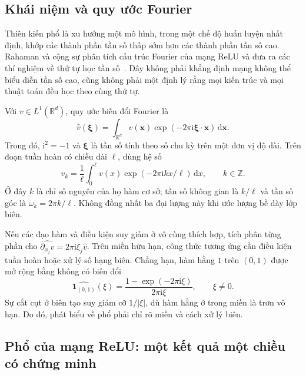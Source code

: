 \subsection{Khái niệm và quy ước Fourier}

Thiên kiến phổ là xu hướng một mô hình, trong một chế độ huấn luyện
nhất định, khớp các thành phần tần số thấp sớm hơn các thành phần tần
số cao. Rahaman và cộng sự phân tích cấu trúc Fourier của mạng ReLU
và đưa ra các thí nghiệm về thứ tự học tần số~\cite{rahaman2019}.
Đây không phải khẳng định mạng không thể biểu diễn tần số cao, cũng
không phải một định lý rằng mọi kiến trúc và mọi thuật toán đều học
theo cùng thứ tự.

Với $v\in L^1(\mathbb{R}^{d})$, quy ước biến đổi Fourier là
\begin{equation}
 \widehat v(\boldsymbol{\xi})
 =\int_{\mathbb{R}^{d}}v(\mathbf{x})
                  \exp(-2\pi\mathrm{i}\boldsymbol{\xi}\cdot\mathbf{x})
                  \,\mathrm{d}\mathbf{x}.
 \label{p4:eq:fourier-transform}
\end{equation}
Trong đó, $\mathrm{i}^2=-1$ và $\boldsymbol{\xi}$ là tần số tính theo
số chu kỳ trên một đơn vị độ dài. Trên đoạn tuần hoàn có chiều dài
$\ell$, dùng hệ số
\begin{equation}
 v_k=\frac{1}{\ell}\int_0^{\ell}v(x)
                \exp(-2\pi\mathrm{i}kx/\ell)\,\mathrm{d}x,
 \qquad k\in\mathbb{Z}.
 \label{p4:eq:fourier-series}
\end{equation}
Ở đây $k$ là chỉ số nguyên của họ hàm cơ sở; tần số không gian là
$k/\ell$ và tần số góc là $\omega_k=2\pi k/\ell$.
Không đồng nhất ba đại lượng này khi ước lượng bề dày lớp biên.

Nếu các đạo hàm và điều kiện suy giảm ở vô cùng thích hợp, tích phân
từng phần cho
$\widehat{\partial_{x_j}v}=2\pi\mathrm{i}\xi_j\widehat v$.
Trên miền hữu hạn, công thức tương ứng cần điều kiện tuần hoàn hoặc
xử lý số hạng biên. Chẳng hạn, hàm hằng $1$ trên $(0,1)$ được mở rộng
bằng không có biến đổi
\begin{equation}
 \widehat{\mathbf{1}_{(0,1)}}(\xi)
 =\frac{1-\exp(-2\pi\mathrm{i}\xi)}{2\pi\mathrm{i}\xi},
 \qquad \xi\ne0.
 \label{p4:eq:window-counterexample}
\end{equation}
Sự cắt cụt ở biên tạo suy giảm cỡ $1/|\xi|$, dù hàm hằng ở trong
miền là trơn vô hạn. Do đó, phát biểu về phổ phải chỉ rõ miền và cách
xử lý biên.

\subsection{Phổ của mạng ReLU: một kết quả một chiều có chứng minh}

